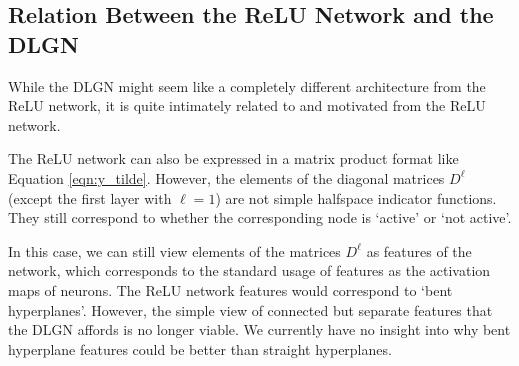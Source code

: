 \documentclass{article} %
\renewcommand{\>}{{\rightarrow}}
\renewcommand{\=}{\stackrel{\triangle}{=}}
\newcommand{\0}{{\mathbf 0}}
\begin{document}
\subsection{Relation Between the ReLU Network and the DLGN}
While the DLGN might seem like a completely different architecture from the ReLU network, it is quite intimately related to and motivated from the ReLU network. 

The ReLU network can also be expressed in a matrix product format like Equation \ref{eqn:y_tilde}. However, the elements of the diagonal matrices $D^\ell$ (except the first layer with $\ell=1$) are not simple halfspace indicator functions. They still correspond to whether the corresponding node is `active' or `not active'. 

In this case, we can still view elements of the matrices $D^\ell$ as features of the network, which corresponds to the standard usage of features as the activation maps of neurons. The ReLU network features would correspond to `bent hyperplanes'. However, the simple view of connected but separate features that the DLGN affords is no longer viable. We currently have no insight into why bent hyperplane features could be better than straight hyperplanes.
\end{document}
